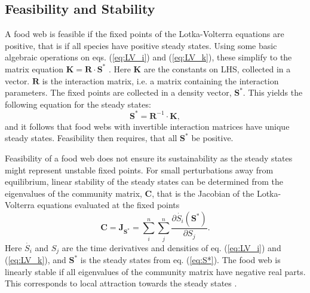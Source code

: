 \subsection{Feasibility and Stability}
A food web is feasible if the fixed points of the Lotka-Volterra equations are positive, that is if all species have positive steady states. Using some basic algebraic operations on eqs. (\ref{eq:LV_i}) and (\ref{eq:LV_k}), these simplify to the matrix equation $\mathbf{K} = \mathbf{R}\cdot \mathbf{S^*}$ \cite{haerter2016food}. %
Here $\mathbf{K}$ are the constants on LHS, collected in a vector. $\mathbf{R}$ is the interaction matrix, i.e. a matrix containing the interaction parameters. 
The fixed points are collected in a density vector, $\mathbf{S^*}$. 
This yields the following equation for the steady states:
\begin{equation}
    \mathbf{S^*} = \mathbf{R}^{-1}\cdot \mathbf{K}, \label{eq:S*} 
\end{equation}
and it follows that food webs with invertible interaction matrices have unique steady states. 
Feasibility then requires, that all $\mathbf{S^*}$ be positive.

Feasibility of a food web does not ensure its sustainability as the steady states might represent unstable fixed points.
For small perturbations away from equilibrium, linear stability of the steady states can be determined from the eigenvalues of the community matrix, $\mathbf{C}$, that is the Jacobian of the Lotka-Volterra equations evaluated at the fixed points
\begin{equation}
    \mathbf{C} = \mathbf{J}_{\mathbf{S^*}} = \sum_i^n\sum_j^n \frac{\partial \dot{S_i}(\mathbf{S^*})}{\partial S_j}.
    \label{eq:C}
\end{equation}
Here $\dot{S_i}$ and $S_j$ are the time derivatives and densities of eq. (\ref{eq:LV_i}) and (\ref{eq:LV_k}), and $\mathbf{S^*}$ is the steady states from eq. (\ref{eq:S*}).
The food web is linearly stable if all eigenvalues of the community matrix have negative real parts. This corresponds to local attraction towards the steady states \cite{strogatz2018nonlinear}.

